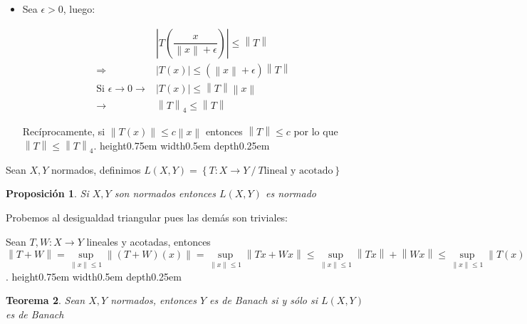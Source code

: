 \documentclass[11pt]{article}
\newcommand{\norm}[1]{\left\lVert#1\right\rVert}
\newcommand{\abs}[1]{\left\lvert#1\right\rvert}
\newcommand{\sett}[1]{\left\lbrace#1\right\rbrace}
\newtheorem{theorem}{Teorema}
\numberwithin{theorem}{subsection}
\newtheorem{proposition}[theorem]{Proposici\'on}
\newenvironment{proof}[1][Demostraci\'on]{\begin{trivlist}
		\item[\hskip \labelsep {\bfseries #1}]}{\end{trivlist}}
\newenvironment{definition}[1][Definici\'on]{\begin{trivlist}
		\item[\hskip \labelsep {\bfseries #1}]}{\end{trivlist}}
\newcommand{\qed}{\nobreak \ifvmode \relax \else
	\ifdim\lastskip<1.5em \hskip-\lastskip
	\hskip1.5em plus0em minus0.5em \fi \nobreak
	\vrule height0.75em width0.5em depth0.25em\fi}
\begin{document}
\begin{proof}
\begin{itemize}
		\item Sea $\epsilon > 0$, luego:
		
		\begin{equation*}
		\begin{array}{cc}
		& \abs{T\left(\dfrac{x}{\norm{x} + \epsilon}\right)} \leq \norm{T} \\
		\Longrightarrow  & \abs{T(x)} \leq \left(\norm{x} + \epsilon\right) \norm{T} \\
		\text{Si } \epsilon \rightarrow 0 \longrightarrow  & \abs{T(x)} \leq \norm{T} \norm{x} \\
		\longrightarrow  & \norm{T}_4 \leq \norm{T}
		\end{array}
		\end{equation*}
		
		Rec\'iprocamente, si $\norm{T(x)} \leq c \norm{x}$ entonces $\norm{T} \leq c$ por lo que $\norm{T} \leq \norm{T}_4$. \qed
		
	\end{itemize}
\end{proof}

\begin{definition}
	Sean $X,Y$ normados, definimos $L(X,Y) = \sett{T:X \rightarrow Y  \ / \ T \text{lineal y acotado}}$
\end{definition}

\begin{proposition}
	Si $X,Y$ son normados entonces $L(X,Y)$ es normado
\end{proposition}

\begin{proof}
	Probemos al desigualdad triangular pues las dem\'as son triviales:
	
	Sean $T,W : X \rightarrow Y$ lineales y acotadas, entonces $\norm{T + W} = \sup\limits_{\norm{x} \leq 1}{\norm{(T + W)(x)}} = \sup\limits_{\norm{x} \leq 1}{\norm{Tx + Wx}} \leq \sup\limits_{\norm{x} \leq 1}{\norm{Tx} + \norm{Wx}} \leq \sup\limits_{\norm{x} \leq 1}{\norm{T(x)}} + \sup\limits_{\norm{x} \leq 1}{\norm{W(x)}} = \norm{T} + \norm{W}$. \qed
	
\end{proof}

\begin{theorem}
	\label{Espacio de operadores es banach si lo es el codominio}
	Sean $X,Y$ normados, entonces $Y$ es de Banach si y s\'olo si $L(X,Y)$ es de Banach
\end{theorem}
\end{document}
